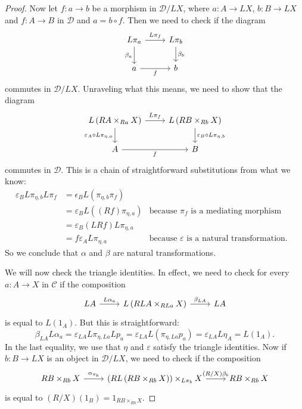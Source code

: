 \begin{proof}
Now let $f : a \to b$ be a morphism in $\mathcal{D}/LX$, where $a : A \to LX$, $b : B \to LX$ and $f:A \to B$ in $\mathcal{D}$ and $a = b \circ f$. Then we need to check if the diagram
\[\begin{tikzcd}
L\pi_a \arrow[r, "L\pi_f"] \arrow[d, swap, "\beta_a"] & L\pi_b \arrow[d, "\beta_b"] \\
a \arrow[r, swap, "f"] & b
\end{tikzcd}\]
commutes in $\mathcal{D}/LX$. Unraveling what this means, we need to show that the diagram
\[ \begin{tikzcd}
L\left(RA \times_{Ra} X\right) \arrow[r, "L\pi_f"] \arrow[d, swap, "\varepsilon_A \circ L\pi_{\eta,a}"] & L \left( RB \times_{Rb} X \right) \arrow[d, "\varepsilon_B \circ L \pi_{\eta,b}"] \\
A \arrow[r, swap, "f"] & B
\end{tikzcd} \]
commutes in $\mathcal{D}$. This is a chain of straightforward substitutions from what we know:
\begin{align*}
\varepsilon_B L\pi_{\eta,b} L\pi_f &= \epsilon_B L \left( \pi_{\eta,b} \pi_f \right)& & \\
&= \varepsilon_B L \left((Rf)\pi_{\eta,a} \right) &\text{because $\pi_f$ is a mediating morphism}& \\
&= \varepsilon_B (LRf) L\pi_{\eta,a} & &\\
&= f \varepsilon_A L\pi_{\eta,a} & \text{because $\varepsilon$ is a natural transformation.} &
\end{align*}
So we conclude that $\alpha$ and $\beta$ are natural transformations.

We will now check the triangle identities. In effect, we need to check for every $a : A \to X$ in $\mathcal{C}$ if the composition
\[ \begin{tikzcd} LA \arrow[r, "L\alpha_a"] & L\left(RLA \times_{RLa} X \right) \arrow[r, "\beta_{LA}"] & LA \end{tikzcd} \]
is equal to $L(1_A)$. But this is straightforward:
\[ \beta_{LA} L\alpha_a = \varepsilon_{LA} L\pi_{\eta,La} Lp_a = \varepsilon_{LA} L \left( \pi_{\eta,La} p_a \right) = \varepsilon_{LA} L \eta_A = L\left(1_A \right). \]
In the last equality, we use that $\eta$ and $\varepsilon$ satisfy the triangle identities. Now if $b : B \to LX$ is an object in $\mathcal{D}/LX$, we need to check if the composition
\[ \begin{tikzcd} RB \times_{Rb} X \arrow[r, "\alpha_{\pi_b}"] & \left(RL\left(RB \times_{Rb} X \right)\right) \times_{L\pi_{b}} X \arrow[r, "(R/X)\beta_{b}"] & RB \times_{Rb} X \end{tikzcd} \]
is equal to $(R/X)(1_B) = 1_{RB \times_{Rb} X}$.
\end{proof}

